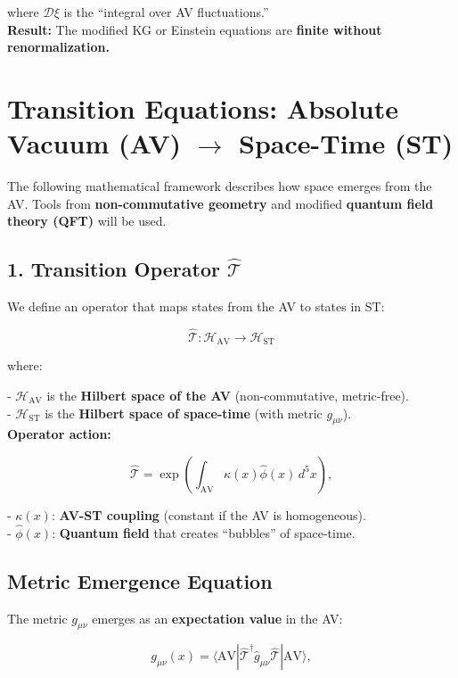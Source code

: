 \documentclass[a4paper]{article}
\theoremstyle{definition}
\theoremstyle{remark}
\numberwithin{equation}{section}
\begin{document}
where \(\mathcal{D}\xi\) is the ``integral over AV fluctuations.''\\

\textbf{Result:} The modified KG or Einstein equations are \textbf{finite without renormalization.}

\section{Transition Equations: Absolute Vacuum (AV) \(\rightarrow\) Space-Time (ST)}

\noindent The following mathematical framework describes how space emerges from the AV. Tools from \textbf{non-commutative geometry} and modified \textbf{quantum field theory (QFT)} will be used.

\subsection{1. Transition Operator \(\hat{\mathcal{T}}\)}

We define an operator that maps states from the AV to states in ST:

\[
\hat{\mathcal{T}} \colon \mathcal{H}_{\text{AV}} \rightarrow \mathcal{H}_{\text{ST}}
\]

where:

- \(\mathcal{H}_{\text{AV}}\) is the \textbf{Hilbert space of the AV} (non-commutative, metric-free).\\
- \(\mathcal{H}_{\text{ST}}\) is the \textbf{Hilbert space of space-time} (with metric \(g_{\mu\nu}\)).\\

\textbf{Operator action:}

\[
\hat{\mathcal{T}} = \exp\left( \int_{\text{AV}} \kappa(x) \hat{\phi}(x) \, d^5x \right),
\]

- \(\kappa(x)\): \textbf{AV-ST coupling} (constant if the AV is homogeneous).\\
- \(\hat{\phi}(x)\): \textbf{Quantum field} that creates ``bubbles'' of space-time.\\

\subsection{Metric Emergence Equation}

The metric \(g_{\mu\nu}\) emerges as an \textbf{expectation value} in the AV:

\[
g_{\mu\nu}(x) = \langle \text{AV} | \hat{\mathcal{T}}^\dagger \hat{g}_{\mu\nu} \hat{\mathcal{T}} | \text{AV} \rangle,
\]
\end{document}
